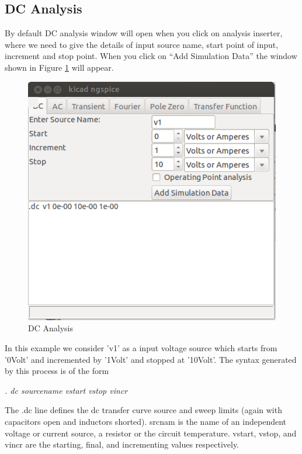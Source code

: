 \subsection{DC Analysis}
By default DC analysis window will open when you click on analysis inserter, where we need to give the details of  input source name, start point of input, increment and  stop point. When you click on “Add Simulation Data” the window shown in Figure \ref{2} will appear.
\begin{figure}
\centering
\includegraphics[width=\textwidth]{figures/2}
\caption{DC Analysis}
\label{2}
\end{figure}
In this example we consider 'v1' as a input voltage source which starts from '0Volt' and incremented by '1Volt' and stopped at '10Volt'. The syntax generated by this process is of the form

\textit{. dc sourcename vstart vstop vincr}

The .dc line defines the dc transfer curve source and sweep limits (again with capacitors open and inductors shorted). srcnam is the name of an independent voltage or current source, a resistor or the circuit temperature. vstart, vstop, and vincr are the starting, final, and incrementing values respectively. 

